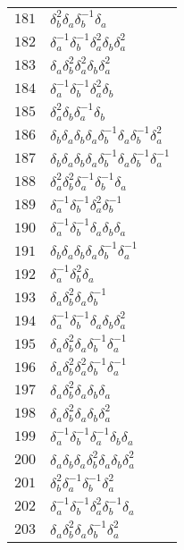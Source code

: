 \documentclass{article}
\begin{document}
\begin{center}
\begin{tabular}{ll}
$181$ & $\delta_b^{2}\delta_a^{}\delta_b^{-1}\delta_a^{}$ \\
$182$ & $\delta_a^{-1}\delta_b^{-1}\delta_a^{2}\delta_b^{}\delta_a^{2}$ \\
$183$ & $\delta_a^{}\delta_b^{2}\delta_a^{2}\delta_b^{}\delta_a^{2}$ \\
$184$ & $\delta_a^{-1}\delta_b^{-1}\delta_a^{2}\delta_b^{}$ \\
$185$ & $\delta_a^{2}\delta_b^{}\delta_a^{-1}\delta_b^{}$ \\
$186$ & $\delta_b^{}\delta_a^{}\delta_b^{}\delta_a^{}\delta_b^{-1}\delta_a^{}\delta_b^{-1}\delta_a^{2}$ \\
$187$ & $\delta_b^{}\delta_a^{}\delta_b^{}\delta_a^{}\delta_b^{-1}\delta_a^{}\delta_b^{-1}\delta_a^{-1}$ \\
$188$ & $\delta_a^{2}\delta_b^{2}\delta_a^{-1}\delta_b^{-1}\delta_a^{}$ \\
$189$ & $\delta_a^{-1}\delta_b^{-1}\delta_a^{2}\delta_b^{-1}$ \\
$190$ & $\delta_a^{-1}\delta_b^{-1}\delta_a^{}\delta_b^{}\delta_a^{}$ \\
$191$ & $\delta_b^{}\delta_a^{}\delta_b^{}\delta_a^{}\delta_b^{-1}\delta_a^{-1}$ \\
$192$ & $\delta_a^{-1}\delta_b^{2}\delta_a^{}$ \\
$193$ & $\delta_a^{}\delta_b^{2}\delta_a^{}\delta_b^{-1}$ \\
$194$ & $\delta_a^{-1}\delta_b^{-1}\delta_a^{}\delta_b^{}\delta_a^{2}$ \\
$195$ & $\delta_a^{}\delta_b^{2}\delta_a^{}\delta_b^{-1}\delta_a^{-1}$ \\
$196$ & $\delta_a^{}\delta_b^{2}\delta_a^{2}\delta_b^{-1}\delta_a^{-1}$ \\
$197$ & $\delta_a^{}\delta_b^{2}\delta_a^{}\delta_b^{}\delta_a^{}$ \\
$198$ & $\delta_a^{}\delta_b^{2}\delta_a^{}\delta_b^{}\delta_a^{2}$ \\
$199$ & $\delta_a^{-1}\delta_b^{-1}\delta_a^{-1}\delta_b^{}\delta_a^{}$ \\
$200$ & $\delta_a^{}\delta_b^{}\delta_a^{}\delta_b^{2}\delta_a^{}\delta_b^{}\delta_a^{2}$ \\
$201$ & $\delta_b^{2}\delta_a^{-1}\delta_b^{-1}\delta_a^{2}$ \\
$202$ & $\delta_a^{-1}\delta_b^{-1}\delta_a^{2}\delta_b^{-1}\delta_a^{}$ \\
$203$ & $\delta_a^{}\delta_b^{2}\delta_a^{}\delta_b^{-1}\delta_a^{2}$ \\

\end{tabular}
\end{center}
\end{document}
